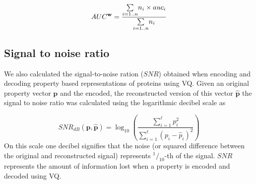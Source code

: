 \[
AUC^{\bf{w}}=\frac{\underset{i=1..n}{\sum}n_{i}\times auc_{i}}{\underset{i=1..n}{\sum}n_{i}}
\]


\subsection{Signal to noise ratio}


We also calculated the signal-to-noise ration ($SNR$) obtained when encoding and decoding property based representations of proteins using VQ. Given an original property vector $\mathbf{p}$ and the encoded, the reconstructed version of this vector $\hat{\mathbf{p}}$ the signal to noise ratio was calculated using the logarithmic decibel scale as 

\[
SNR_{dB}(\mathbf{p},\hat{\mathbf{p}})=\log_{10}\left(\frac{\sum\limits _{i=1}^{\ell}p_{i}^{2}}{\sum\limits _{i=1}^{\ell}(p_{i}-\hat{p}_{i})^{2}}\right)
\]
On this scale one decibel signifies that the noise (or squared difference between the original and reconstructed signal) represents $^{1}/_{10}$-th of the signal. $SNR$ represents the amount of information lost when a property is encoded and decoded using VQ.

